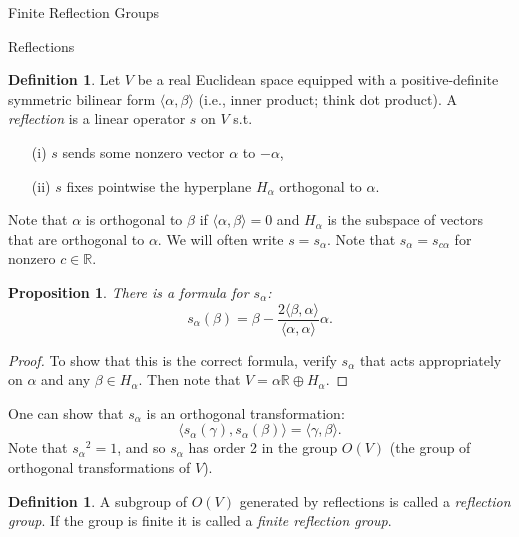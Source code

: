 \documentclass[12pt]{nauthesis}
\newtheorem{proposition}[theorem]{Proposition}
\theoremstyle{definition}
\newtheorem{definition}[theorem]{Definition}
\newcommand{\R}{\mathbb{R}}
\renewcommand{\(}{\big(}
\renewcommand{\)}{\big)}
\begin{document}
\begin{flushleft}

\begin{chapter}{Finite Reflection Groups}

\begin{section}{Reflections}

\begin{definition}
Let $V$ be a real Euclidean space equipped with a positive-definite symmetric bilinear form $\langle\alpha, \beta\rangle$ (i.e., inner product; think dot product).  A {\it reflection} is a linear operator $s$ on $V$ s.t. 
\begin{enumerate}
\item[(i)] $s$ sends some nonzero vector $\alpha$ to $-\alpha$,
\item[(ii)] $s$ fixes pointwise the hyperplane $H_\alpha$ orthogonal to $\alpha$.
\end{enumerate}
\end{definition}

\medskip

Note that $\alpha$ is orthogonal to $\beta$ if $\langle\alpha,\beta\rangle=0$ and $H_\alpha$ is the subspace of vectors that are orthogonal to $\alpha$.  We will often write $s=s_\alpha$.  Note that $s_\alpha=s_{c\alpha}$ for nonzero $c \in \R$.

\medskip

\begin{proposition}
There is a formula for $s_\alpha$:
	$$s_\alpha(\beta)=\beta-\frac{2\langle\beta,\alpha\rangle}{\langle\alpha,\alpha\rangle}\alpha.$$
\end{proposition}

\begin{proof} To show that this is the correct formula, verify $s_\alpha$ that acts appropriately on $\alpha$ and any $\beta \in H_\alpha$.  Then note that $V=\alpha\R \oplus H_\alpha$.
\end{proof}

\medskip

One can show that $s_\alpha$ is an orthogonal transformation: 
	$$\langle s_\alpha(\gamma),s_\alpha(\beta)\rangle=\langle\gamma,\beta\rangle.$$
Note that ${s_\alpha}^2=1$, and so $s_\alpha$ has order 2 in the group $O(V)$ (the group of orthogonal transformations of $V$).

\medskip

\begin{definition}
A subgroup of $O(V)$ generated by reflections is called a {\it reflection group}.  If the group is finite it is called a {\it finite reflection group}.
\end{definition}


\end{section}
\end{chapter}
\end{flushleft}
\end{document}
